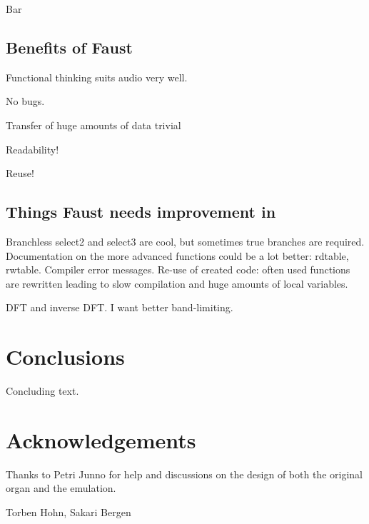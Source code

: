 \documentclass[11pt,a4paper]{article}
\begin{document}
Bar


\subsection{Benefits of Faust}

Functional thinking suits audio very well.

No bugs.

Transfer of huge amounts of data trivial

Readability!

Reuse!


\subsection{Things Faust needs improvement in}

Branchless select2 and select3 are cool, but sometimes true branches are required.
Documentation on the more advanced functions could be a lot better: rdtable, rwtable.
Compiler error messages.
Re-use of created code: often used functions are rewritten leading to slow compilation and huge amounts of local variables.

DFT and inverse DFT. I want better band-limiting.

\section{Conclusions}

Concluding text.

\section{Acknowledgements}

Thanks to Petri Junno for help and discussions on the design of both the original organ and the emulation.

Torben Hohn, Sakari Bergen





\end{document}
